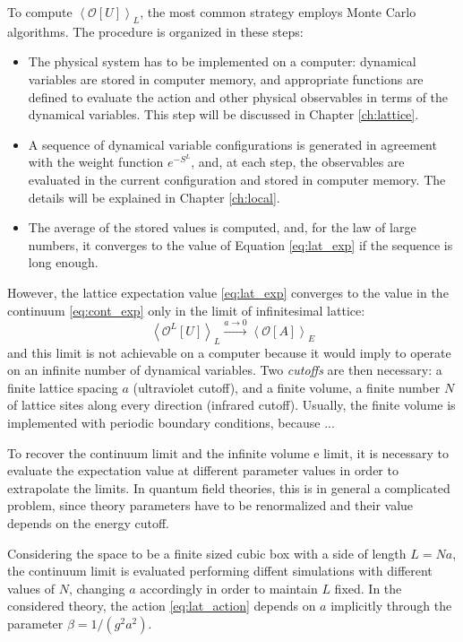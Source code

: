 To compute $\left<\mathcal O[U]\right>_L$, the most common strategy employs Monte Carlo algorithms.
The procedure is organized in these steps:
\begin{itemize}
    \item The physical system has to be implemented on a computer: dynamical variables are stored in computer memory,
        and appropriate functions are defined to evaluate the action and other physical observables in terms of the dynamical variables.
        This step will be discussed in Chapter \ref{ch:lattice}.
    \item A sequence of dynamical variable configurations is generated in agreement with the weight function $e^{-S^L}$, and, at each step,
        the observables are evaluated in the current configuration and stored in computer memory. The details will be explained in Chapter \ref{ch:local}.
    \item The average of the stored values is computed, and, for the law of large numbers,
        it converges to the value of Equation \ref{eq:lat_exp} if the sequence is long enough.
\end{itemize}

However, the lattice expectation value \eqref{eq:lat_exp} converges to the value in the continuum \eqref{eq:cont_exp} only in the limit of infinitesimal lattice:
\[
    \left<\mathcal O^L[U]\right>_L \xrightarrow{a\to0} \left<\mathcal O[A]\right>_E
\]
and this limit is not achievable on a computer because it would imply to operate on an infinite number of dynamical variables.
Two \emph{cutoffs} are then necessary: a finite lattice spacing $a$ (ultraviolet cutoff),
and a finite volume, \ie a finite number $N$ of lattice sites along every direction (infrared cutoff).
Usually, the finite volume is implemented with periodic boundary conditions, because ... 

To recover the continuum limit and the infinite volume e limit,
it is necessary to evaluate the expectation value at different parameter values in order to extrapolate the limits.
In quantum field theories, this is in general a complicated problem,
since theory parameters have to be renormalized and their value depends on the energy cutoff.

Considering the space to be a finite sized cubic box with a side of length $L=Na$,
the continuum limit is evaluated performing diffent simulations with different values of $N$, changing $a$ accordingly in order to maintain $L$ fixed.
In the considered theory, the action \eqref{eq:lat_action} depends on $a$ implicitly through the parameter $\beta = 1/(g^2a^2)$.

